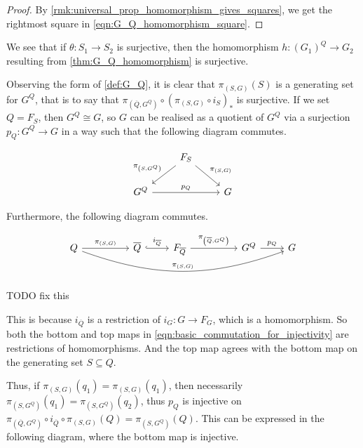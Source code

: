 \begin{proof}
	By \cref{rmk:universal_prop_homomorphism_gives_squares}, we get the rightmost square in \eqref{eqn:G_Q_homomorphism_square}.
\end{proof}

We see that if $\theta \colon S_1 \to S_2$ is surjective, then the homomorphism $h \colon (G_1)^Q \to G_2$ resulting from \cref{thm:G_Q_homomorphism} is surjective.

Observing the form of \cref{def:G_Q}, it is clear that $\pi_{(S,G)}(S)$ is a generating set for $G^Q$, that is to say that $\pi_{(\overline{Q},G^Q)} \circ \left(\pi_{(S,G)} \circ i_S \right)_*$ is surjective.
If we set $Q=F_S$, then $G^Q \cong G$, so $G$ can be realised as a quotient of $G^Q$ via a surjection $p_Q \colon G^Q \to G$ in a way such that the following diagram commutes.

\begin{equation*}
	\begin{tikzcd}
		& F_S \ar[dl, "\pi_{\left(S,G^Q\right)}"'] \ar[dr, "\pi_{\left(S,G\right)}"] &
		\\ G^Q \ar[rr, "p_Q"]  & & G
	\end{tikzcd}
\end{equation*}

Furthermore, the following diagram commutes.

\begin{equation}
	\begin{tikzcd}
		Q \ar[rr, "\pi_{(S,G)}"] \ar[rrrrrr, bend right=20, "\pi_{(S,G)}"] & & \overline{Q} \ar[r, hook, "i_{\overline{Q}}"] & F_{\overline{Q}} \ar[rr, "\pi_{\left(\overline{Q},G^Q\right)}"] & & G^Q \ar[r, "p_Q"] & G
	\end{tikzcd}
	\label{eqn:basic_commutation_for_injectivity}
\end{equation}

TODO fix this

This is because $i_{\overline{Q}}$ is a restriction of $i_G \colon G \to F_G$, which is a homomorphism.
So both the bottom and top maps in \eqref{eqn:basic_commutation_for_injectivity} are restrictions of homomorphisms.
And the top map agrees with the bottom map on the generating set $S \subseteq Q$.

Thus, if $\pi_{(S,G)}(q_1) = \pi_{(S,G)}(q_1)$, then necessarily $\pi_{\left(S,G^Q\right)}(q_1) = \pi_{\left( S,G^Q \right)}(q_2)$, thus $p_Q$ is injective on $\pi_{\left( \overline{Q},G^Q \right)} \circ i_{\overline{Q}} \circ \pi_{(S,G)}(Q) = \pi_{\left(S,G^Q\right)}(Q)$.
This can be expressed in the following diagram, where the bottom map is injective.

